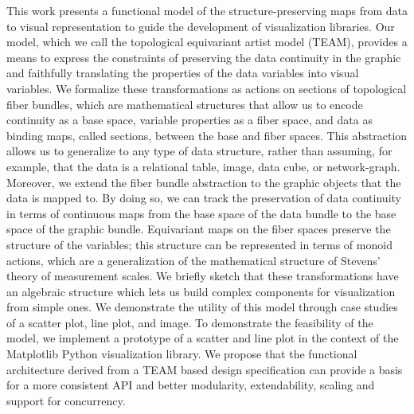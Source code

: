 This work presents a functional model of the structure-preserving maps from data to visual representation to guide the development of visualization libraries. Our model, which we call the  topological equivariant artist model (TEAM), provides a means to express the constraints of preserving the data continuity in the graphic and faithfully translating the properties of the data variables into visual variables. We formalize these transformations as actions on sections of topological fiber bundles, which are mathematical structures that allow us to encode continuity as a base space, variable properties as a fiber space, and data as binding maps, called sections, between the base and fiber spaces. This abstraction allows us to generalize to any type of data structure, rather than assuming, for example, that the data is a relational table, image, data cube, or network-graph. Moreover, we extend the fiber bundle abstraction to the graphic objects that the data is mapped to. By doing so, we can track the preservation of data continuity in terms of continuous maps from the base space of the data bundle to the base space of the graphic bundle. Equivariant maps on the fiber spaces preserve the structure of the variables; this structure can be represented in terms of monoid actions, which are a generalization of the mathematical structure of Stevens’ theory of measurement scales. We briefly sketch that these transformations have an algebraic structure which lets us build complex components for visualization from simple ones. We demonstrate the utility of this model through case studies of a scatter plot, line plot, and image. To demonstrate the feasibility of the model, we implement a prototype of a scatter and line plot in the context of the Matplotlib Python visualization library.  We propose that the functional architecture derived from a TEAM based design specification can provide a basis for a more consistent API and better modularity, extendability, scaling and support for concurrency.